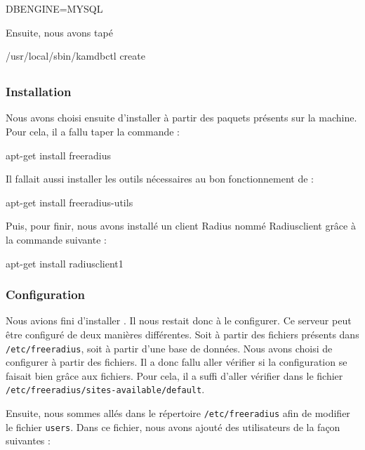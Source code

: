DBENGINE=MYSQL

Ensuite, nous avons tapé 
\begin{shellcode}
/usr/local/sbin/kamdbctl create
\end{shellcode}
\todo

\subsection{\frad}
\subsubsection{Installation}

Nous avons choisi ensuite d'installer {\frad} à partir des paquets présents sur la machine. Pour cela, il a fallu taper la commande :

\begin{shellcode}
apt-get install freeradius
\end{shellcode}

Il fallait aussi installer les outils nécessaires au bon fonctionnement de {\frad} :

\begin{shellcode}
apt-get install freeradius-utils
\end{shellcode}

Puis, pour finir, nous avons installé un client Radius nommé Radiusclient grâce à la commande suivante :

\begin{shellcode}
apt-get install radiusclient1
\end{shellcode}

\subsubsection{Configuration}
Nous avions fini d'installer {\frad}. Il nous restait donc à le configurer. Ce serveur {\rad} peut être configuré de deux manières différentes. Soit à partir des fichiers présents dans \texttt{/etc/freeradius}, soit à partir d'une base de données. Nous avons choisi de configurer à partir des fichiers. Il a donc fallu aller vérifier si la configuration se faisait bien grâce aux fichiers. Pour cela, il a suffi d'aller vérifier dans le fichier \texttt{/etc/freeradius/sites-available/default}.

Ensuite, nous sommes allés dans le répertoire \texttt{/etc/freeradius} afin de modifier le fichier \texttt{users}. Dans ce fichier, nous avons ajouté des utilisateurs de la façon suivantes :

